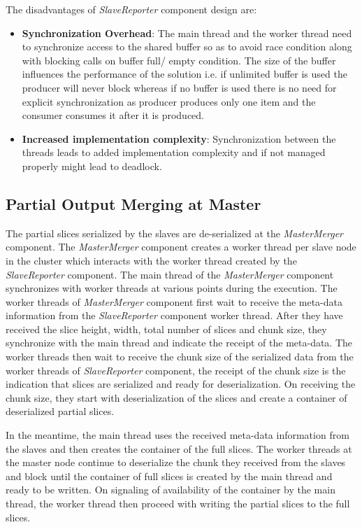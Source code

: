 The disadvantages of \textit{SlaveReporter} component design are:
\begin{itemize}
\item \textbf{Synchronization Overhead}: The main thread and the worker thread need to synchronize access to the shared buffer so as to avoid race condition along with blocking calls on buffer full/ empty condition. The size of the buffer influences the performance of the solution i.e. if unlimited buffer is used the producer will never block whereas if no buffer is used there is no need for explicit synchronization as producer produces only one item and the consumer consumes it after it is produced.
\item \textbf{Increased implementation complexity}: Synchronization between the threads leads to added implementation complexity and if not managed properly might lead to deadlock. 
\end{itemize} 

\subsection{Partial Output Merging at Master} \label{MMComp}

The partial slices serialized by the slaves are de-serialized at the \textit{MasterMerger} component. The \textit{MasterMerger} component creates a worker thread per slave node in the cluster which interacts with the worker thread created by the \textit{SlaveReporter} component. The main thread of the \textit{MasterMerger} component synchronizes with worker threads at various points during the execution. The worker threads of \textit{MasterMerger} component first wait to receive the meta-data information from the \textit{SlaveReporter} component worker thread. After they have received the slice height, width, total number of slices and chunk size, they synchronize with the main thread and indicate the receipt of the meta-data. The worker threads then wait to receive the chunk size of the serialized data from the worker threads of \textit{SlaveReporter} component, the receipt of the chunk size is the indication that slices are serialized and ready for deserialization. On receiving the chunk size, they start with deserialization of the slices and create a container of deserialized partial slices. \newline

In the meantime, the main thread uses the received meta-data information from the slaves and then creates the container of the full slices. The worker threads at the master node continue to deserialize the chunk they received from the slaves and block until the container of full slices is created by the main thread and ready to be written. On signaling of availability of the container by the main thread, the worker thread then proceed with writing the partial slices to the full slices.\newline 

